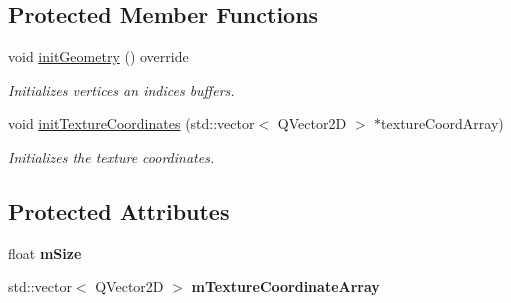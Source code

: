 \subsection*{Protected Member Functions}
\begin{DoxyCompactItemize}
\item 
\mbox{\label{class_geometry_engine_1_1_geometry_world_item_1_1_geometry_item_1_1_cube_acdfe53700969b8060b6649f4cea14b41}} 
void \mbox{\hyperlink{class_geometry_engine_1_1_geometry_world_item_1_1_geometry_item_1_1_cube_acdfe53700969b8060b6649f4cea14b41}{init\+Geometry}} () override
\begin{DoxyCompactList}\small\item\em Initializes vertices an indices buffers. \end{DoxyCompactList}\item 
\mbox{\label{class_geometry_engine_1_1_geometry_world_item_1_1_geometry_item_1_1_cube_ab76ab6dee3ea30ce6b4f4bb102fe9a7e}} 
void \mbox{\hyperlink{class_geometry_engine_1_1_geometry_world_item_1_1_geometry_item_1_1_cube_ab76ab6dee3ea30ce6b4f4bb102fe9a7e}{init\+Texture\+Coordinates}} (std\+::vector$<$ Q\+Vector2D $>$ $\ast$texture\+Coord\+Array)
\begin{DoxyCompactList}\small\item\em Initializes the texture coordinates. \end{DoxyCompactList}\end{DoxyCompactItemize}
\subsection*{Protected Attributes}
\begin{DoxyCompactItemize}
\item 
\mbox{\label{class_geometry_engine_1_1_geometry_world_item_1_1_geometry_item_1_1_cube_ab8f55c65010441e00d9b7268285095d4}} 
float {\bfseries m\+Size}
\item 
\mbox{\label{class_geometry_engine_1_1_geometry_world_item_1_1_geometry_item_1_1_cube_a323483a46488df07601e22333a655e9f}} 
std\+::vector$<$ Q\+Vector2D $>$ {\bfseries m\+Texture\+Coordinate\+Array}
\end{DoxyCompactItemize}


